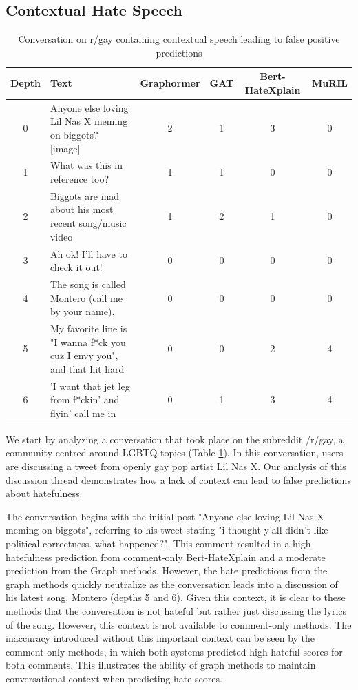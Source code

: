 \documentclass[letterpaper]{article} %
\begin{document}
\subsection{Contextual Hate Speech}
\begin{table}
    \centering
        \caption{Conversation on r/gay containing contextual speech leading to false positive predictions}
    \begin{tabular}{c|p{8cm}|c|c|c|c}
        Depth & Text & Graphormer & GAT & Bert-HateXplain & MuRIL \\
        \hline
        \hline
        0 & Anyone else loving Lil Nas X meming on biggots? [image] & 2 & 1 & 3 & 0 \\
        \hline
        1 & What was this in reference too? & 1 & 1 & 0 & 0  \\
        \hline
        2 & Biggots are mad about his most recent song/music video & 1 & 2 & 1 & 0  \\
        \hline
        3 & Ah ok! I'll have to check it out! & 0 & 0 & 0 & 0 \\
        \hline
        4 & The song is called Montero (call me by your name). & 0 & 0 & 0 & 0 \\
        \hline
        5 & My favorite line is "I wanna f*ck you cuz I envy you", and that hit hard & 0 & 0 & 2 & 4 \\
        \hline
        6 & 'I want that jet leg from f*ckin' and flyin' call me in & 0 & 1 & 3 & 4 \\
    \end{tabular}
    \label{tab:contextual-gay}
\end{table}
We start by analyzing a conversation that took place on the subreddit /r/gay, a community centred around LGBTQ topics (Table \ref{tab:contextual-gay}). In this conversation, users are discussing a tweet from openly gay pop artist Lil Nas X. Our analysis of this discussion thread demonstrates how a lack of context can lead to false predictions about hatefulness.

The conversation begins with the initial post "Anyone else loving Lil Nas X meming on biggots", referring to his tweet stating "i thought y'all didn't like political correctness. what happened?". This comment resulted in a high hatefulness prediction from comment-only Bert-HateXplain and a moderate prediction from the Graph methods. However, the hate predictions from the graph methods quickly neutralize as the conversation leads into a discussion of his latest song, Montero (depths 5 and 6). Given this context, it is clear to these methods that the conversation is not hateful but rather just discussing the lyrics of the song. However, this context is not available to comment-only methods. The inaccuracy introduced without this important context can be seen by the comment-only methods, in which both systems predicted high hateful scores for both comments. This illustrates the ability of graph methods to maintain conversational context when predicting hate scores.
\end{document}

